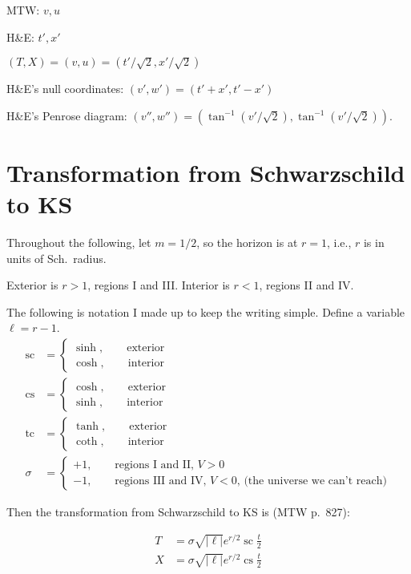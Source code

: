 \documentclass{article}
\begin{document}
MTW: $v,u$

H\&E: $t',x'$

$(T,X)=(v,u)=(t'/\sqrt2,x'/\sqrt2)$

H\&E's null coordinates: $(v',w')=(t'+x',t'-x')$

H\&E's Penrose diagram: $(v'',w'')=(\tan^{-1}(v'/\sqrt2),\tan^{-1}(v'/\sqrt2))$.

\section{Transformation from Schwarzschild to KS}

Throughout the following, let $m=1/2$, so the horizon is at $r=1$, i.e., $r$ is in units of Sch.~radius.

Exterior is $r>1$, regions I and III. Interior is $r<1$, regions II and IV.

\newcommand{\lambert}{\ell}

The following is notation I made up to keep the writing simple.
Define a variable $\lambert=r-1 $.
\begin{align}
  \operatorname{sc} &= \begin{cases}
\sinh, \qquad \text{exterior}\\
\cosh, \qquad \text{interior}
\end{cases} \\
  \operatorname{cs} &= \begin{cases}
\cosh, \qquad \text{exterior}\\
\sinh, \qquad \text{interior}
\end{cases} \\
  \operatorname{tc} &= \begin{cases}
\tanh, \qquad \text{exterior}\\
\coth, \qquad \text{interior}
\end{cases}\\
\sigma &= \begin{cases}
+1, \qquad \text{regions I and II, $V>0$}\\
-1, \qquad \text{regions III and IV, $V<0$, (the universe we can't reach)} 
\end{cases}
\end{align}

Then the transformation from Schwarzschild to KS is (MTW p.~827):

\begin{align}
  T &= \sigma \sqrt{|\lambert |} e^{r/2}\operatorname{sc}\frac{t}{2} \\
  X &= \sigma \sqrt{|\lambert |} e^{r/2}\operatorname{cs}\frac{t}{2} 
\end{align}
\end{document}
